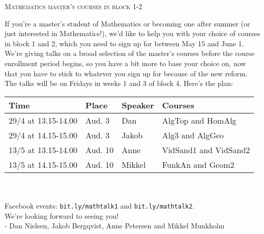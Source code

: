 \newcommand{\mytitle}{\textsc{Master's courses in block 1-2}}


\pagestyle{empty}

\begin{center}
{\LARGE \textsc{Mathematics master's courses in block 1-2}}
\end{center}

\large
If you're a master's student of Mathematics or becoming one after summer {\normalsize (or just interested in Mathematics!)}, we'd like to help you with your choice of courses in block 1 and 2, which you need to sign up for between May 15 and June 1.\\

We're giving talks on a broad selection of the master's courses before the course enrollment period begins, so you have a bit more to base your choice on, now that you have to stick to whatever you sign up for because of the new reform.\\

The talks will be on Fridays in weeks 1 and 3 of block 4. Here's the plan:\\

\begin{tabular}{llll}
  Time & Place & Speaker & Courses\\\hline
  29/4 at 13.15-14.00 & Aud. 3 & Dan & AlgTop and HomAlg\\
  29/4 at 14.15-15.00 & Aud. 3 & Jakob & Alg3 and AlgGeo\\
  13/5 at 13.15-14.00 & Aud. 10 & Anne & VidSand1 and VidSand2\\
  13/5 at 14.15-15.00 & Aud. 10 & Mikkel & FunkAn and Geom2
\end{tabular}\\\\

Facebook events: {\color{blue}\texttt{bit.ly/mathtalk1}} and {\color{blue}\texttt{bit.ly/mathtalk2}}.\\

We're looking forward to seeing you!\\

- Dan Nielsen, Jakob Bergqvist, Anne Petersen and Mikkel Munkholm



